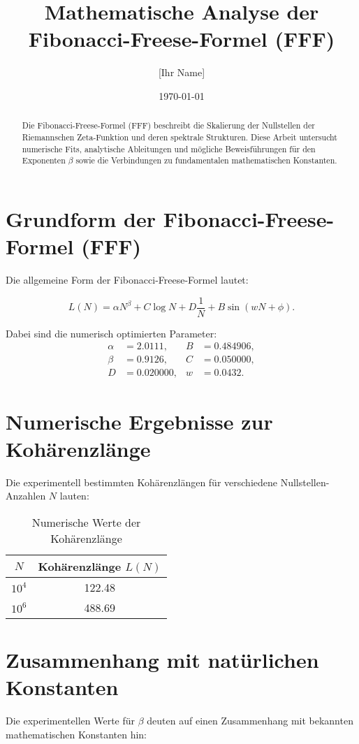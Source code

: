 \documentclass[a4paper,12pt]{article}
\title{Mathematische Analyse der Fibonacci-Freese-Formel (FFF)}
\author{[Ihr Name]}
\date{\today}
\begin{document}
\maketitle

\begin{abstract}
Die Fibonacci-Freese-Formel (FFF) beschreibt die Skalierung der Nullstellen der Riemannschen Zeta-Funktion und deren spektrale Strukturen. Diese Arbeit untersucht numerische Fits, analytische Ableitungen und mögliche Beweisführungen für den Exponenten $\beta$ sowie die Verbindungen zu fundamentalen mathematischen Konstanten.
\end{abstract}

\section{Grundform der Fibonacci-Freese-Formel (FFF)}
Die allgemeine Form der Fibonacci-Freese-Formel lautet:

\begin{equation}
L(N) = \alpha N^\beta + C \log N + D \frac{1}{N} + B \sin(w N + \phi).
\end{equation}

Dabei sind die numerisch optimierten Parameter:
\begin{align*}
\alpha &= 2.0111, & B &= 0.484906, \\
\beta &= 0.9126, & C &= 0.050000, \\
D &= 0.020000, & w &= 0.0432.
\end{align*}

\section{Numerische Ergebnisse zur Kohärenzlänge}
Die experimentell bestimmten Kohärenzlängen für verschiedene Nullstellen-Anzahlen $N$ lauten:

\begin{table}[h]
    \centering
    \begin{tabular}{|c|c|}
    \hline
    $N$ & Kohärenzlänge $L(N)$ \\
    \hline
    $10^4$ & 122.48 \\
    $10^6$ & 488.69 \\
    \hline
    \end{tabular}
    \caption{Numerische Werte der Kohärenzlänge}
\end{table}

\section{Zusammenhang mit natürlichen Konstanten}
Die experimentellen Werte für $\beta$ deuten auf einen Zusammenhang mit bekannten mathematischen Konstanten hin:
\end{document}
